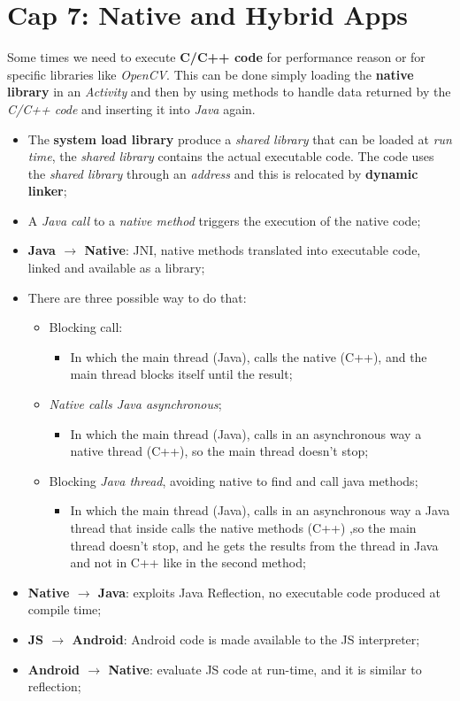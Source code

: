 \documentclass{article}
\begin{document}
\section{Cap 7: Native and Hybrid Apps}
Some times we need to execute \textbf{C/C++ code} for performance reason or for specific libraries like \emph{OpenCV}. This can be done simply loading the \textbf{native library} in an \emph{Activity} and then by using methods to handle data returned by the \emph{C/C++ code} and inserting it into \emph{Java} again.
\begin{itemize}
\item The \textbf{system load library} produce a \emph{shared library} that can be loaded at \emph{run time}, the \emph{shared library} contains the actual executable code. The code uses the \emph{shared library} through an \emph{address} and this is relocated by \textbf{dynamic linker};
\item A \emph{Java call} to a \emph{native method} triggers the execution of the native code;
\item \textbf{Java $\rightarrow$ Native}: JNI, native methods translated into executable code, linked and available as a library;
\item There are three possible way to do that:
\begin{itemize}
\item Blocking call:
\begin{itemize}
\item In which the main thread (Java), calls the native (C++), and the main thread blocks itself until the result;
\end{itemize}
\item \emph{Native calls Java asynchronous};
\begin{itemize}
\item In which the main thread (Java), calls in an asynchronous way a native thread (C++), so the main thread doesn't stop;
\end{itemize}
\item Blocking \emph{Java thread}, avoiding native to find and call java methods;
\begin{itemize}
\item In which the main thread (Java), calls in an asynchronous way a Java thread that inside calls the native methods (C++)  ,so the main thread doesn't stop, and he gets the results from the thread in Java and not in C++ like in the second method;
\end{itemize}
\end{itemize}
\item \textbf{Native $\rightarrow$ Java}: exploits Java Reflection, no executable code produced at compile time;
\item \textbf{JS $\rightarrow$ Android}: Android code is made available to the JS interpreter;
\item \textbf{Android $\rightarrow$ Native}: evaluate JS code at run-time, and it is similar to reflection;
\end{itemize}
\end{document}
